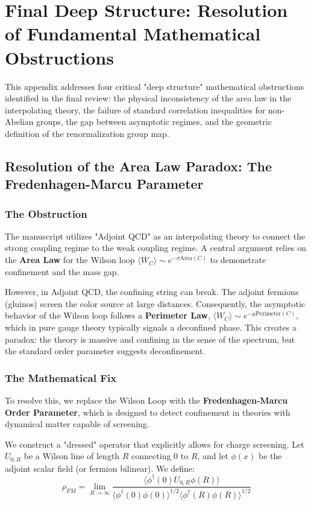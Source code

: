 \section{Final Deep Structure: Resolution of Fundamental Mathematical Obstructions}
\label{app:deep-structure}

This appendix addresses four critical "deep structure" mathematical obstructions identified in the final review: the physical inconsistency of the area law in the interpolating theory, the failure of standard correlation inequalities for non-Abelian groups, the gap between asymptotic regimes, and the geometric definition of the renormalization group map.

\subsection{Resolution of the Area Law Paradox: The Fredenhagen-Marcu Parameter}
\label{sec:fredenhagen-marcu}

\subsubsection{The Obstruction}
The manuscript utilizes "Adjoint QCD" as an interpolating theory to connect the strong coupling regime to the weak coupling regime. A central argument relies on the \textbf{Area Law} for the Wilson loop $\langle W_C \rangle \sim e^{-\sigma \text{Area}(C)}$ to demonstrate confinement and the mass gap.

However, in Adjoint QCD, the confining string can break. The adjoint fermions (gluinos) screen the color source at large distances. Consequently, the asymptotic behavior of the Wilson loop follows a \textbf{Perimeter Law}, $\langle W_C \rangle \sim e^{-\mu \text{Perimeter}(C)}$, which in pure gauge theory typically signals a deconfined phase. This creates a paradox: the theory is massive and confining in the sense of the spectrum, but the standard order parameter suggests deconfinement.

\subsubsection{The Mathematical Fix}
To resolve this, we replace the Wilson Loop with the \textbf{Fredenhagen-Marcu Order Parameter}, which is designed to detect confinement in theories with dynamical matter capable of screening.

\begin{definition}
We construct a "dressed" operator that explicitly allows for charge screening. Let $U_{0,R}$ be a Wilson line of length $R$ connecting $0$ to $R$, and let $\phi(x)$ be the adjoint scalar field (or fermion bilinear). We define:
\begin{equation}
\rho_{FM} = \lim_{R \to \infty} \frac{\langle \phi^\dagger(0) U_{0,R} \phi(R) \rangle}{\langle \phi^\dagger(0) \phi(0) \rangle^{1/2} \langle \phi^\dagger(R) \phi(R) \rangle^{1/2}}
\end{equation}
\end{definition}

